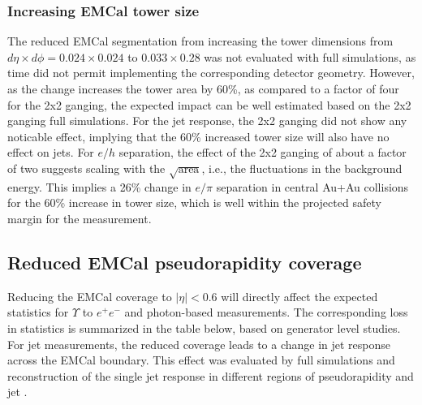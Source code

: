 \subsubsection{Increasing EMCal tower size}
The reduced EMCal segmentation from increasing the tower dimensions
from $d\eta \times d\phi = 0.024 \times 0.024$ to $0.033 \times 0.28$
was not evaluated with full \geant simulations, as time did not permit
implementing the corresponding detector geometry. However, as the
change increases the tower area by 60\%, as compared to a factor of
four for the 2x2 ganging, the expected impact can be well estimated
based on the 2x2 ganging full simulations. For the jet response, the
2x2 ganging did not show any noticable effect, implying that the 60\%
increased tower size will also have no effect on jets. For $e/h$
separation, the effect of the 2x2 ganging of about a factor of two
suggests scaling with the $\sqrt{\mbox{area}}$, i.e., the fluctuations
in the background energy. This implies a 26\% change in $e/\pi$
separation in central Au+Au collisions for the 60\% increase in tower
size, which is well within the projected safety margin for the
measurement.

\subsection{Reduced EMCal pseudorapidity coverage}
Reducing the EMCal coverage to $| \eta | < 0.6$ will directly affect
the expected statistics for $\Upsilon$ to $e^+ e^-$ and photon-based
measurements. The corresponding loss in statistics is summarized in
the table below, based on generator level studies. For jet
measurements, the reduced coverage leads to a change in jet response
across the EMCal boundary. This effect was evaluated by full \geant
simulations and reconstruction of the single jet response in different
regions of pseudorapidity and jet \pt.

